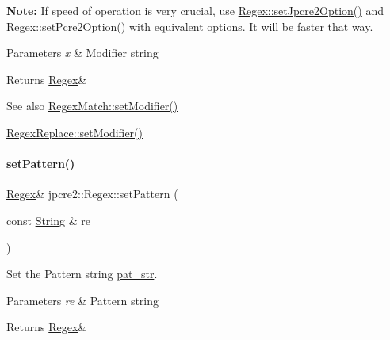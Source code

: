 {\bfseries Note\+:} If speed of operation is very crucial, use \hyperlink{classjpcre2_1_1Regex_a031617a19638ef752dcd2b29fa3464d5_a031617a19638ef752dcd2b29fa3464d5}{Regex\+::set\+Jpcre2\+Option()} and \hyperlink{classjpcre2_1_1Regex_acdc6f97f4030ae109c4e1a4e2310bceb_acdc6f97f4030ae109c4e1a4e2310bceb}{Regex\+::set\+Pcre2\+Option()} with equivalent options. It will be faster that way. 
\begin{DoxyParams}{Parameters}
{\em x} & Modifier string \\
\hline
\end{DoxyParams}
\begin{DoxyReturn}{Returns}
\hyperlink{classjpcre2_1_1Regex}{Regex}\& 
\end{DoxyReturn}
\begin{DoxySeeAlso}{See also}
\hyperlink{classjpcre2_1_1RegexMatch_a9df7e92f96b61553f62720cb8f5f23e5_a9df7e92f96b61553f62720cb8f5f23e5}{Regex\+Match\+::set\+Modifier()} 

\hyperlink{classjpcre2_1_1RegexReplace_ae2abe2994b0fbe54950f88e63000c910_ae2abe2994b0fbe54950f88e63000c910}{Regex\+Replace\+::set\+Modifier()} 
\end{DoxySeeAlso}
\hypertarget{classjpcre2_1_1Regex_a85d9a514ea86ae68533223adac6c6bd8_a85d9a514ea86ae68533223adac6c6bd8}{}\label{classjpcre2_1_1Regex_a85d9a514ea86ae68533223adac6c6bd8_a85d9a514ea86ae68533223adac6c6bd8} 
\paragraph{\texorpdfstring{set\+Pattern()}{setPattern()}}
{\footnotesize\ttfamily \hyperlink{classjpcre2_1_1Regex}{Regex}\& jpcre2\+::\+Regex\+::set\+Pattern (\begin{DoxyParamCaption}\item[{const \hyperlink{namespacejpcre2_a91f03070152fb228bc116c5a737f1d16}{String} \&}]{re }\end{DoxyParamCaption})\hspace{0.3cm}{\ttfamily [inline]}}



Set the Pattern string \hyperlink{classjpcre2_1_1Regex_a0bceb85b6dbba355b56b5cc312214435}{pat\+\_\+str}. 


\begin{DoxyParams}{Parameters}
{\em re} & Pattern string \\
\hline
\end{DoxyParams}
\begin{DoxyReturn}{Returns}
\hyperlink{classjpcre2_1_1Regex}{Regex}\& 
\end{DoxyReturn}
\hypertarget{classjpcre2_1_1Regex_acdc6f97f4030ae109c4e1a4e2310bceb_acdc6f97f4030ae109c4e1a4e2310bceb}{}\label{classjpcre2_1_1Regex_acdc6f97f4030ae109c4e1a4e2310bceb_acdc6f97f4030ae109c4e1a4e2310bceb} 
